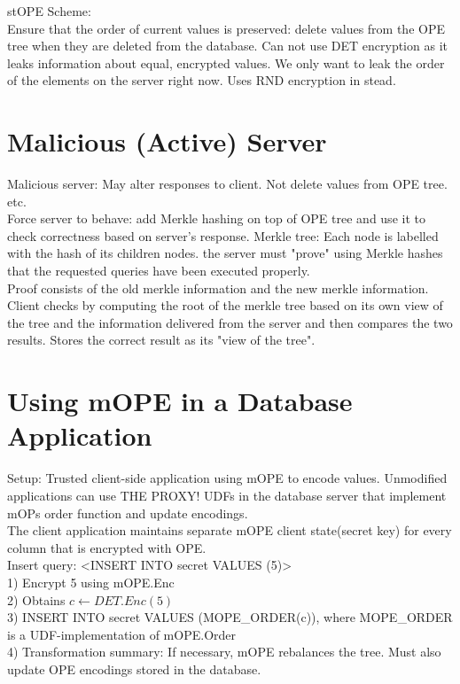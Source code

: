 \documentclass[10pt]{article}
\begin{document}
stOPE Scheme:\\

Ensure that the order of current values is preserved: delete values from the OPE tree when they are deleted from the database. Can not use DET encryption as it leaks information about equal, encrypted values. We only want to leak the order of the elements on the server right now. Uses RND encryption in stead.\\


\section{Malicious (Active) Server}

Malicious server: May alter responses to client. Not delete values from OPE tree. etc.\\

Force server to behave: add Merkle hashing on top of OPE tree and use it to check correctness based on server's response. Merkle tree: Each node is labelled with the hash of its children nodes. the server must "prove" using Merkle hashes that the requested queries have been executed properly.\\

Proof consists of the old merkle information and the new merkle information. \\

Client checks by computing the root of the merkle tree based on its own view of the tree and the information delivered from the server and then compares the two results. Stores the correct result as its "view of the tree".\\

\section{Using mOPE in a Database Application}

Setup: Trusted client-side application using mOPE to encode values. Unmodified applications can use THE PROXY! UDFs in the database server that implement mOPs order function and update encodings.\\

The client application maintains separate mOPE client state(secret key) for every column that is encrypted with OPE.\\

Insert query: <INSERT INTO secret VALUES (5)>\\
1) Encrypt 5 using mOPE.Enc\\
2) Obtains $c \leftarrow DET.Enc(5)$\\
3) INSERT INTO secret VALUES (MOPE\_ORDER(c)), where MOPE\_ORDER is a UDF-implementation of mOPE.Order\\
4) Transformation summary: If necessary, mOPE rebalances the tree. Must also update OPE encodings stored in the database.\\
\end{document}
